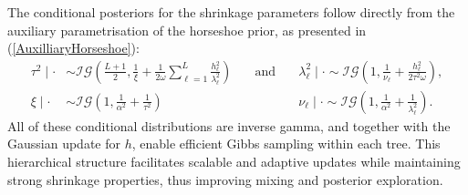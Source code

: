 The conditional posteriors for the shrinkage parameters follow directly from the auxiliary parametrisation of the horseshoe prior, as presented in (\ref{AuxilliaryHorseshoe}):
\begin{equation}\label{PosteriorAuxiliary}
\begin{alignedat}{2}
\tau^2 \mid \cdot &\sim \mathcal{IG}\left(\frac{L+1}{2}, \frac{1}{\xi} + \frac{1}{2\omega} \sum_{\ell=1}^{L} \frac{h_\ell^2}{\lambda_\ell^2}\right)
&\quad\text{and}\quad&
\lambda_\ell^2 \mid \cdot \sim \mathcal{IG}\left(1, \frac{1}{\nu_\ell} + \frac{h_\ell^2}{2\tau^2\omega}\right), \\
\xi \mid \cdot &\sim \mathcal{IG}\left(1, \frac{1}{\alpha^2} + \frac{1}{\tau^2}\right)
&\quad\text{   }\quad&
\nu_\ell \mid \cdot \sim \mathcal{IG}\left(1, \frac{1}{\alpha^2} + \frac{1}{\lambda_\ell^2}\right).
\end{alignedat}
\end{equation}
All of these conditional distributions are inverse gamma, and together with the Gaussian update for $h$, enable efficient Gibbs sampling within each tree. 
This hierarchical structure facilitates scalable and adaptive updates while maintaining strong shrinkage properties, thus improving mixing and posterior exploration.












